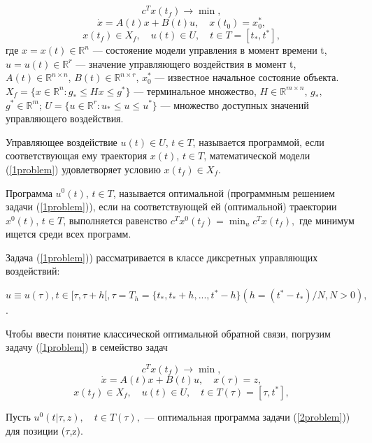 \begin{equation} \label{1problem}
    c^Tx(t_f)\to \min,
    \end{equation}
$$
    \dot{x}=A(t)x+B(t)u,\quad x(t_0)=x_0^*,
    $$
$$
    x(t_f) \in X_f,\quad  u(t)\in U, \quad  t\in T = [t_*, t^*],
    $$
где  $x = x(t)\in \mathbb{R}^n$ — состояение модели управления в момент времени t,
$u = u(t)\in \mathbb{R}^r$ — значение управляющего воздействия в момент t, 
$A(t)\in \mathbb{R}^{n\times n}$,
$B(t)\in \mathbb{R}^{n\times r}$,
$x_0^*$ — известное начальное состояние объекта.
$X_f=\{x\in \mathbb{R}^n: g_*\leq Hx \leq g^*\}$ --- терминальное
множество, $H\in \mathbb{R}^{m\times n}$, $g_*,$ $g^* \in \mathbb{R}^m$;
$U=\{u\in \mathbb{R}^r: u_*\le u\le u^*\}$ --- множество доступных значений
управляющего воздействия.

\begin{definition}  Управляющее воздействие $u(t)\in U$, $t\in T$, называется программой, если соответствующая ему
траектория $x(t)$, $t\in T$, математической модели (\ref{1problem}) удовлетворяет
условию $x(t_f)\in X_f$.
\end{definition}

\begin{definition}  Программа $u^0(t)$, $t\in T$,
называется оптимальной (программным решением задачи (\ref{1problem})), если на соответствующей ей (оптимальной) траектории $x^0(t)$, $t\in T$, выполняется равенство $c^Tx^0(t_f) = \min_u c^Tx(t_f),$ где минимум ищется среди всех программ. 
\end{definition}

Задача (\ref{1problem})) рассматривается в классе диксретных управляющих воздействий:

$u\equiv u(\tau), t\in [ \tau,\tau + h[, \tau = T_h = \{t_*,t_* + h,...,t^* - h\} (h = (t^* - t_*)/N, N > 0),$.

Чтобы ввести понятие классической оптимальной обратной связи, погрузим задачу (\ref{1problem}) в семейство задач

\begin{equation} \label{2problem}
    c^Tx(t_f)\to \min,
    \end{equation}
$$
    \dot{x}=A(t)x+B(t)u,\quad  x(\tau) = z,
    $$
$$
    x(t_f) \in X_f,\quad  u(t)\in U, \quad  t\in T(\tau) = [\tau, t^*],
    $$
    
Пусть $u^0(t|\tau,z),\quad t\in T(\tau),$ — оптимальная программа задачи (\ref{2problem})) для позиции ($\tau$,z).

